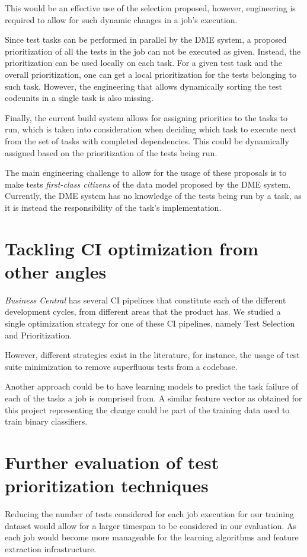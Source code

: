 This would be an effective use of the selection proposed, however, engineering is required
to allow for such dynamic changes in a job's execution. 

Since test tasks can be performed in parallel by the DME system, a 
proposed prioritization of all the tests in the job can not be executed as given. 
Instead, the prioritization can be used locally on each task. For a given
test task and the overall prioritization, one can get a local prioritization for the
tests belonging to such task. However, the engineering that allows dynamically 
sorting the test codeunits in a single task is also missing.

Finally, the current build system allows for assigning priorities to the tasks to run,
which is taken into consideration when deciding which task to execute next from the 
set of tasks with completed dependencies. This could be dynamically assigned based on 
the prioritization of the tests being run. 

The main engineering challenge to allow for the usage of these proposals is to make
tests \emph{first-class citizens} of the data model proposed by the DME system.
Currently, the DME system has no knowledge of the tests being run by a task, as
it is instead the responsibility of the task's implementation.

\section{Tackling CI optimization from other angles}
\emph{Business Central} has several CI pipelines that constitute each of the different
development cycles, from different areas that the product has. We studied a single
optimization strategy for one of these CI pipelines, namely Test Selection and Prioritization.

However, different strategies exist in the literature, for instance, the usage of
test suite minimization to remove superfluous tests from a codebase.

Another approach could be to have learning models to predict the task failure
of each of the tasks a job is comprised from. A similar feature vector as
obtained for this project representing the change could be part of the training 
data used to train binary classifiers.

\section{Further evaluation of test prioritization techniques}\label{s:future-evalp}
Reducing the number of tests considered for each job execution for our training
dataset would allow for a larger timespan to be considered in our evaluation.
As each job would become more manageable for the learning algorithms and feature
extraction infrastructure. 

